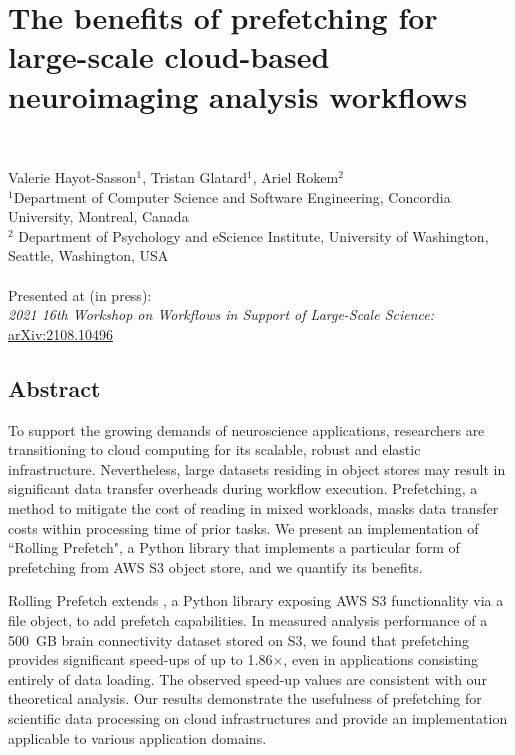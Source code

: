 \chapter{The benefits of prefetching for large-scale cloud-based neuroimaging
analysis workflows}~\label{chp:rp}



Valerie Hayot-Sasson$^1$, Tristan Glatard$^1$, Ariel Rokem$^2$ \\
\begingroup \footnotesize $^1$Department of Computer Science and Software
Engineering, Concordia University, Montreal, Canada\\
$^2$ Department of Psychology and eScience Institute, University of Washington,
Seattle, Washington, USA\\
\endgroup
\vspace{5pt} \\
Presented at (in press): \\
\hspace*{10pt} \textit{2021 16th Workshop on Workflows in Support of Large-Scale
Science:} \url{arXiv:2108.10496}

\section{Abstract}
To support the growing demands of neuroscience applications, researchers are
transitioning to cloud computing for its scalable, robust and elastic
infrastructure. Nevertheless, large datasets residing in object stores may
result in significant data transfer overheads during workflow execution.
Prefetching, a method to mitigate the cost of reading in mixed workloads, masks
data transfer costs within processing time of prior tasks. We present an
implementation of ``Rolling Prefetch", a Python library that implements a
particular form of prefetching from AWS S3 object store, and we quantify its
benefits.

Rolling Prefetch extends \sfs, a Python library exposing AWS S3 functionality
via a file object, to add prefetch capabilities. In measured analysis
performance of a 500~GB brain connectivity dataset stored on S3, we found that
prefetching provides significant speed-ups of up to 1.86$\times$, even in
applications consisting entirely of data loading. The observed speed-up values
are consistent with our theoretical analysis. Our results demonstrate the
usefulness of prefetching for scientific data processing on cloud
infrastructures and provide an implementation applicable to various application
domains.


